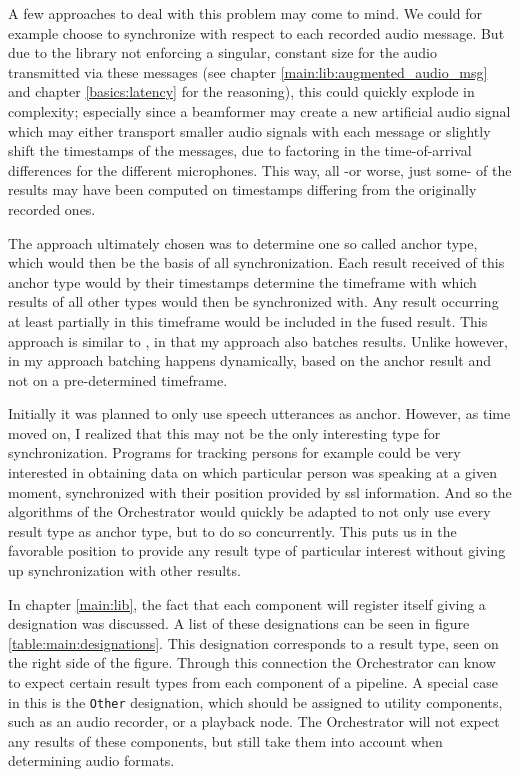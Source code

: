 A few approaches to deal with this problem may come to mind.
We could for example choose to synchronize with respect to each recorded audio message.
But due to the library not enforcing a singular, constant size for the audio transmitted via these messages (see chapter \ref{main:lib:augmented_audio_msg} and chapter \ref{basics:latency} for the reasoning), this could quickly explode in complexity; especially since a beamformer may create a new artificial audio signal which may either transport smaller audio signals with each message or slightly shift the timestamps of the messages, due to factoring in the time-of-arrival differences for the different microphones.
This way, all -or worse, just some- of the results may have been computed on timestamps differing from the originally recorded ones.

The approach ultimately chosen was to determine one so called anchor type, which would then be the basis of all synchronization.
Each result received of this anchor type would by their timestamps determine the timeframe with which results of all other types would then be synchronized with.
Any result occurring at least partially in this timeframe would be included in the fused result.
This approach is similar to \cite{10.1117/12.138164}, in that my approach also batches results.
Unlike \cite{10.1117/12.138164} however, in my approach batching happens dynamically, based on the anchor result and not on a pre-determined timeframe.

Initially it was planned to only use speech utterances as anchor.
However, as time moved on, I realized that this may not be the only interesting type for synchronization.
Programs for tracking persons for example could be very interested in obtaining data on which particular person was speaking at a given moment, synchronized with their position provided by \gls{ssl} information.
And so the algorithms of the Orchestrator would quickly be adapted to not only use every result type as anchor type, but to do so concurrently.
This puts us in the favorable position to provide any result type of particular interest without giving up synchronization with other results.

In chapter \ref{main:lib}, the fact that each component will register itself giving a designation was discussed.
A list of these designations can be seen in figure \ref{table:main:designations}.
This designation corresponds to a result type, seen on the right side of the figure.
Through this connection the Orchestrator can know to expect certain result types from each component of a pipeline.
A special case in this is the \texttt{Other} designation, which should be assigned to utility components, such as an audio recorder, or a playback node.
The Orchestrator will not expect any results of these components, but still take them into account when determining audio formats.

